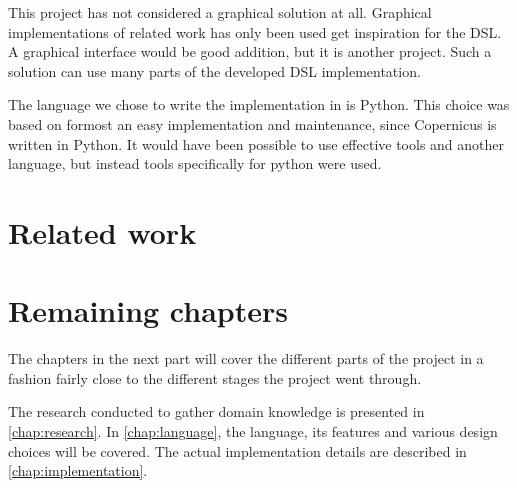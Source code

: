 This project has not considered a graphical solution at all. Graphical
implementations of related work has only been used get inspiration for
the DSL. A graphical interface would be good addition, but it is
another project. Such a solution can use many parts of the developed
DSL implementation.

The language we chose to write the implementation in is Python. This
choice was based on formost an easy implementation and maintenance,
since Copernicus is written in Python. It would have been possible to
use effective tools and another language, but instead tools
specifically for python were used.


\section{Related work}



\section{Remaining chapters}
The chapters in the next part will cover the different parts of the
project in a fashion fairly close to the different stages the project
went through.

The research conducted to gather domain knowledge is presented in
\autoref{chap:research}. In \autoref{chap:language}, the language, its
features and various design choices will be covered. The actual
implementation details are described in \autoref{chap:implementation}.
